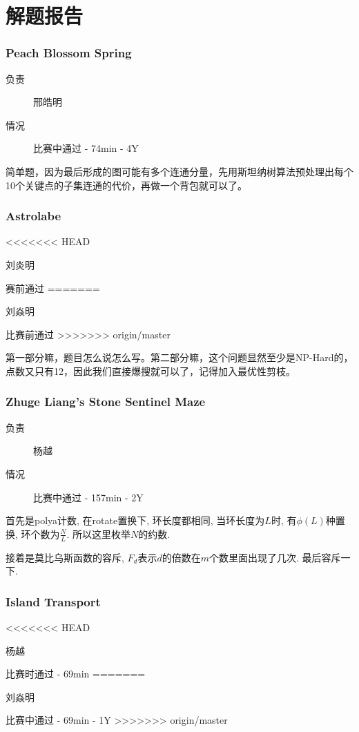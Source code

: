 \documentclass[a4paper, 11pt, nofonts, nocap, fancyhdr]{ctexart}
\newcommand{\problem}[1]{\subsubsection{#1}}
\begin{document}
\section{解题报告}


\problem{Peach Blossom Spring}

\begin{description}
\item[负责] 邢皓明
\item[情况] 比赛中通过 - 74min - 4Y
\end{description}

简单题，因为最后形成的图可能有多个连通分量，先用斯坦纳树算法预处理出每个10个关键点的子集连通的代价，再做一个背包就可以了。

\problem{Astrolabe}

\begin{description}
<<<<<<< HEAD
\item[负责] 刘炎明
\item[情况] 赛前通过
=======
\item[负责] 刘焱明
\item[情况] 比赛前通过
>>>>>>> origin/master
\end{description}

第一部分嘛，题目怎么说怎么写。第二部分嘛，这个问题显然至少是NP-Hard的，点数又只有12，因此我们直接爆搜就可以了，记得加入最优性剪枝。

\problem{Zhuge Liang's Stone Sentinel Maze}

\begin{description}
\item[负责] 杨越
\item[情况] 比赛中通过 - 157min - 2Y
\end{description}

首先是polya计数, 在rotate置换下, 环长度都相同, 当环长度为$L$时, 有$\phi(L)$种置换, 环个数为$\frac{N}{L}$. 所以这里枚举$N$的约数.

接着是莫比乌斯函数的容斥, $F_d$表示$d$的倍数在$m$个数里面出现了几次. 最后容斥一下.

\problem{Island Transport}

\begin{description}
<<<<<<< HEAD
\item[负责] 杨越
\item[情况] 比赛时通过 - 69min
=======
\item[负责] 刘焱明
\item[情况] 比赛中通过 - 69min - 1Y
>>>>>>> origin/master
\end{description}
\end{document}
